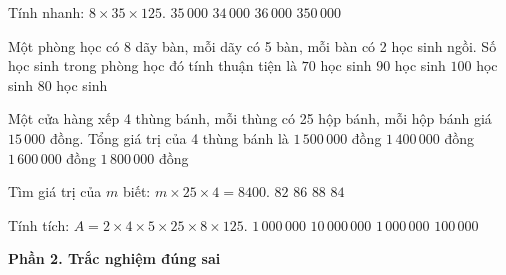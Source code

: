 \begin{ex} %
Tính nhanh: $8 \times 35 \times 125$.
\choice
{\True $35\,000$}
{$34\,000$}
{$36\,000$}
{$350\,000$}
\end{ex}

\begin{ex} %
Một phòng học có 8 dãy bàn, mỗi dãy có 5 bàn, mỗi bàn có 2 học sinh ngồi. Số học sinh trong phòng học đó tính thuận tiện là
\choice
{$70$ học sinh}
{$90$ học sinh}
{$100$ học sinh}
{\True $80$ học sinh}
\end{ex}

\begin{ex} %
Một cửa hàng xếp 4 thùng bánh, mỗi thùng có 25 hộp bánh, mỗi hộp bánh giá $15\,000$ đồng. Tổng giá trị của 4 thùng bánh là
\choice
{\True $1\,500\,000$ đồng}
{$1\,400\,000$ đồng}
{$1\,600\,000$ đồng}
{$1\,800\,000$ đồng}
\end{ex}

\begin{ex} %
Tìm giá trị của $m$ biết: $m \times 25 \times 4 = 8400$.
\choice
{$82$}
{$86$}
{$88$}
{\True $84$}
\end{ex}

\begin{ex} %
Tính tích: $A = 2 \times 4 \times 5 \times 25 \times 8 \times 125$.
\choice
{$1\,000\,000$}
{$10\,000\,000$}
{\True $1\,000\,000$}
{$100\,000$}
\end{ex}

\textbf{Phần 2. Trắc nghiệm đúng sai}

